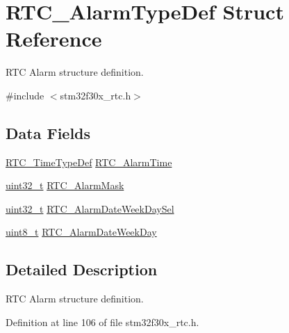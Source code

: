 \hypertarget{struct_r_t_c___alarm_type_def}{\section{R\-T\-C\-\_\-\-Alarm\-Type\-Def Struct Reference}
\label{struct_r_t_c___alarm_type_def}
}


R\-T\-C Alarm structure definition.  




{\ttfamily \#include $<$stm32f30x\-\_\-rtc.\-h$>$}

\subsection*{Data Fields}
\begin{DoxyCompactItemize}
\item 
\hyperlink{struct_r_t_c___time_type_def}{R\-T\-C\-\_\-\-Time\-Type\-Def} \hyperlink{struct_r_t_c___alarm_type_def_a4f54e02d1953bac8e352731344d5a260}{R\-T\-C\-\_\-\-Alarm\-Time}
\item 
\hyperlink{stdint_8h_a435d1572bf3f880d55459d9805097f62}{uint32\-\_\-t} \hyperlink{struct_r_t_c___alarm_type_def_a8a646c3b686c845c689900285b7c272e}{R\-T\-C\-\_\-\-Alarm\-Mask}
\item 
\hyperlink{stdint_8h_a435d1572bf3f880d55459d9805097f62}{uint32\-\_\-t} \hyperlink{struct_r_t_c___alarm_type_def_a8ccb20d2f65477dc97084c65ed455fb4}{R\-T\-C\-\_\-\-Alarm\-Date\-Week\-Day\-Sel}
\item 
\hyperlink{stdint_8h_aba7bc1797add20fe3efdf37ced1182c5}{uint8\-\_\-t} \hyperlink{struct_r_t_c___alarm_type_def_a15045e2af14cc47e70666bbfab123431}{R\-T\-C\-\_\-\-Alarm\-Date\-Week\-Day}
\end{DoxyCompactItemize}


\subsection{Detailed Description}
R\-T\-C Alarm structure definition. 

Definition at line 106 of file stm32f30x\-\_\-rtc.\-h.



